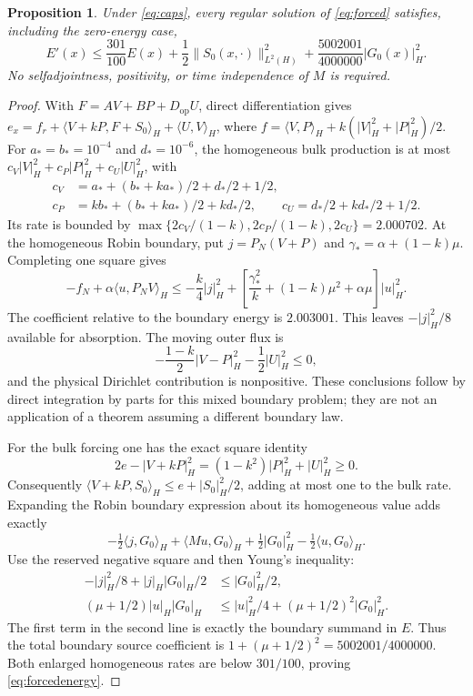 \documentclass[11pt]{article}
\newcommand{\PN}{P_{\!N}}
\newcommand{\ip}[2]{\langle #1,#2\rangle_H}
\newcommand{\norm}[1]{\lvert #1\rvert_H}
\newcommand{\Dmat}{D_{\mathrm{op}}}
\newtheorem{proposition}{Proposition}
\begin{document}
\begin{proposition}
Under \eqref{eq:caps}, every regular solution of \eqref{eq:forced}
satisfies, including the zero-energy case,
\begin{equation}
 E'(x)\le\frac{301}{100}E(x)
 +\frac12\|S_0(x,\cdot)\|_{L^2(H)}^2
 +\frac{5002001}{4000000}\norm{G_0(x)}^2.
 \label{eq:forcedenergy}
\end{equation}
No selfadjointness, positivity, or time independence of $M$ is required.
\end{proposition}
\begin{proof}
With $F=AV+BP+\Dmat U$, direct differentiation gives
$e_x=f_r+\ip{V+kP}{F+S_0}+\ip{U}{V}$, where
$f=\ip{V}{P}+k(\norm{V}^2+\norm{P}^2)/2$.
For $a_*=b_*=10^{-4}$ and $d_*=10^{-6}$, the homogeneous bulk
production is at most $c_V\norm{V}^2+c_P\norm{P}^2+c_U\norm{U}^2$, with
\begin{align*}
 c_V&=a_*+(b_*+ka_*)/2+d_*/2+1/2,\\
 c_P&=kb_*+(b_*+ka_*)/2+kd_*/2,\qquad
 c_U=d_*/2+kd_*/2+1/2.
\end{align*}
Its rate is bounded by
$\max\{2c_V/(1-k),2c_P/(1-k),2c_U\}=2.000702$.
At the homogeneous Robin boundary, put $j=\PN(V+P)$ and
$\gamma_*=\alpha+(1-k)\mu$. Completing one square gives
\[
 -f_N+\alpha\ip{u}{\PN V}
 \le-\frac{k}{4}\norm{j}^2+
 \left[\frac{\gamma_*^2}{k}+(1-k)\mu^2+\alpha\mu\right]\norm{u}^2.
\]
The coefficient relative to the boundary energy is $2.003001$.
This leaves $-\norm{j}^2/8$ available for absorption.
The moving outer flux is
\[
 -\frac{1-k}{2}\norm{V-P}^2-\frac12\norm{U}^2\le0,
\]
and the physical Dirichlet contribution is nonpositive. These conclusions
follow by direct integration by parts for this mixed boundary problem;
they are not an application of a theorem assuming a different boundary law.

For the bulk forcing one has the exact square identity
\[
 2e-\norm{V+kP}^2=(1-k^2)\norm{P}^2+\norm{U}^2\ge0.
\]
Consequently
$\ip{V+kP}{S_0}\le e+\norm{S_0}^2/2$, adding at most one to the
bulk rate. Expanding the Robin boundary expression about its homogeneous
value adds exactly
\[
 -\tfrac12\ip{j}{G_0}+\ip{Mu}{G_0}
       +\tfrac12\norm{G_0}^2-\tfrac12\ip{u}{G_0}.
\]
Use the reserved negative square and then Young's inequality:
\begin{align*}
 -\norm{j}^2/8+\norm{j}\norm{G_0}/2&\le\norm{G_0}^2/2,\\
 (\mu+1/2)\norm{u}\norm{G_0}
 &\le\norm{u}^2/4+(\mu+1/2)^2\norm{G_0}^2.
\end{align*}
The first term in the second line is exactly the boundary summand in
$E$. Thus the total boundary source coefficient is
$1+(\mu+1/2)^2=5002001/4000000$. Both enlarged homogeneous rates are
below $301/100$, proving \eqref{eq:forcedenergy}.
\end{proof}
\end{document}
